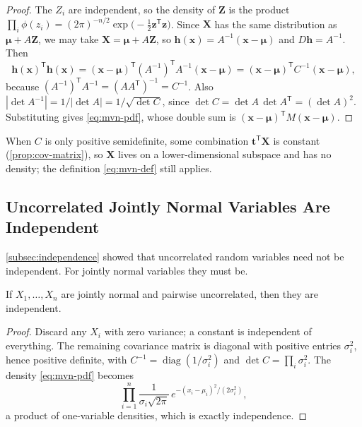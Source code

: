 \begin{proof}
	The $Z_{i}$ are independent, so the density of $\bm{Z}$ is the product
	$\prod_{i}\phi(z_{i})=(2\pi)^{-n/2}\exp\bigl(-\tfrac12\bm{z}^{\mathsf{T}}\bm{z}\bigr)$.
	Since $\bm{X}$ has the same distribution as $\bm{\mu}+A\bm{Z}$, we may take $\bm{X}=\bm{\mu}+A\bm{Z}$, so $\bm{h}(\bm{x})=A^{-1}(\bm{x}-\bm{\mu})$ and $D\bm{h}=A^{-1}$.
	Then
	\[
		\bm{h}(\bm{x})^{\mathsf{T}}\bm{h}(\bm{x})
		=(\bm{x}-\bm{\mu})^{\mathsf{T}}(A^{-1})^{\mathsf{T}}A^{-1}(\bm{x}-\bm{\mu})
		=(\bm{x}-\bm{\mu})^{\mathsf{T}}C^{-1}(\bm{x}-\bm{\mu}) ,
	\]
	because $(A^{-1})^{\mathsf{T}}A^{-1}=(AA^{\mathsf{T}})^{-1}=C^{-1}$.
	Also $|\det A^{-1}|=1/|\det A|=1/\sqrt{\det C}$, since $\det C=\det A\,\det A^{\mathsf{T}}=(\det A)^{2}$.
	Substituting gives \eqref{eq:mvn-pdf}, whose double sum is $(\bm{x}-\bm{\mu})^{\mathsf{T}}M(\bm{x}-\bm{\mu})$.
\end{proof}

When $C$ is only positive semidefinite, some combination $\bm{t}^{\mathsf{T}}\bm{X}$ is constant (\autoref{prop:cov-matrix}), so $\bm{X}$ lives on a lower-dimensional subspace and has no density; the definition \eqref{eq:mvn-def} still applies.

\subsection{Uncorrelated Jointly Normal Variables Are Independent}

\autoref{subsec:independence} showed that uncorrelated random variables need not be independent.
For jointly normal variables they must be.

\begin{proposition}\label{prop:mvn-uncorrelated}
	If $X_{1},\dots,X_{n}$ are jointly normal and pairwise uncorrelated, then they are independent.
\end{proposition}

\begin{proof}
	Discard any $X_{i}$ with zero variance; a constant is independent of everything.
	The remaining covariance matrix is diagonal with positive entries $\sigma_{i}^{2}$, hence positive definite, with $C^{-1}=\operatorname{diag}(1/\sigma_{i}^{2})$ and $\det C=\prod_{i}\sigma_{i}^{2}$.
	The density \eqref{eq:mvn-pdf} becomes
	\[
		\prod_{i=1}^{n}\frac{1}{\sigma_{i}\sqrt{2\pi}}\,e^{-(x_{i}-\mu_{i})^{2}/(2\sigma_{i}^{2})} ,
	\]
	a product of one-variable densities, which is exactly independence.
\end{proof}

